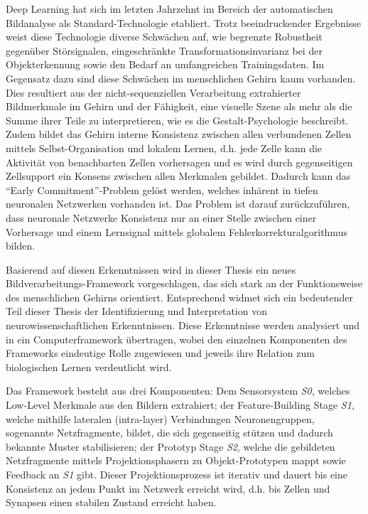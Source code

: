 Deep Learning hat sich im letzten Jahrzehnt im Bereich der automatischen Bildanalyse als Standard-Technologie etabliert.
Trotz beeindruckender Ergebnisse weist diese Technologie diverse Schwächen auf, wie begrenzte Robustheit gegenüber Störsignalen, eingeschränkte Transformationsinvarianz bei der Objekterkennung sowie den Bedarf an umfangreichen Trainingsdaten.
Im Gegensatz dazu sind diese Schwächen im menschlichen Gehirn kaum vorhanden.
Dies resultiert aus der nicht-sequenziellen Verarbeitung extrahierter Bildmerkmale im Gehirn und der Fähigkeit, eine visuelle Szene als mehr als die Summe ihrer Teile zu interpretieren, wie es die Gestalt-Psychologie beschreibt. Zudem bildet das Gehirn interne Konsistenz zwischen allen verbundenen Zellen mittels Selbst-Organisation und lokalem Lernen, d.h. jede Zelle kann die Aktivität von benachbarten Zellen vorhersagen und es wird durch gegenseitigen Zellsupport ein Konsens zwischen allen Merkmalen gebildet. Dadurch kann das ``Early Commitment''-Problem gelöst werden, welches inhärent in tiefen neuronalen Netzwerken vorhanden ist. Das Problem ist darauf zurückzuführen, dass neuronale Netzwerke Konsistenz nur an einer Stelle zwischen einer Vorhersage und einem Lernsignal mittels globalem Fehlerkorrekturalgorithmus bilden.

Basierend auf diesen Erkenntnissen wird in dieser Thesis ein neues Bildverarbeitungs-Framework vorgeschlagen, das sich stark an der Funktionsweise des menschlichen Gehirns orientiert.
Entsprechend widmet sich ein bedeutender Teil dieser Thesis der Identifizierung und Interpretation von neurowissenschaftlichen Erkenntnissen.
Diese Erkenntnisse werden analysiert und in ein Computerframework übertragen, wobei den einzelnen Komponenten des Frameworks eindeutige Rolle zugewiesen und jeweils ihre Relation zum biologischen Lernen verdeutlicht wird.

Das Framework besteht aus drei Komponenten: Dem Sensorsystem \emph{S0}, welches Low-Level Merkmale aus den Bildern extrahiert; der Feature-Building Stage \emph{S1}, welche mithilfe lateralen (intra-layer) Verbindungen Neuronengruppen, sogenannte Netzfragmente, bildet, die sich gegenseitig stützen und dadurch bekannte Muster stabilisieren; der Prototyp Stage \emph{S2}, welche die gebildeten Netzfragmente  mittels Projektionsphasern zu Objekt-Prototypen mappt sowie Feedback an \emph{S1} gibt.
Dieser Projektionsprozess ist iterativ und dauert bis eine Konsistenz an jedem Punkt im Netzwerk erreicht wird, d.h. bis Zellen und Synapsen einen stabilen Zustand erreicht haben.

